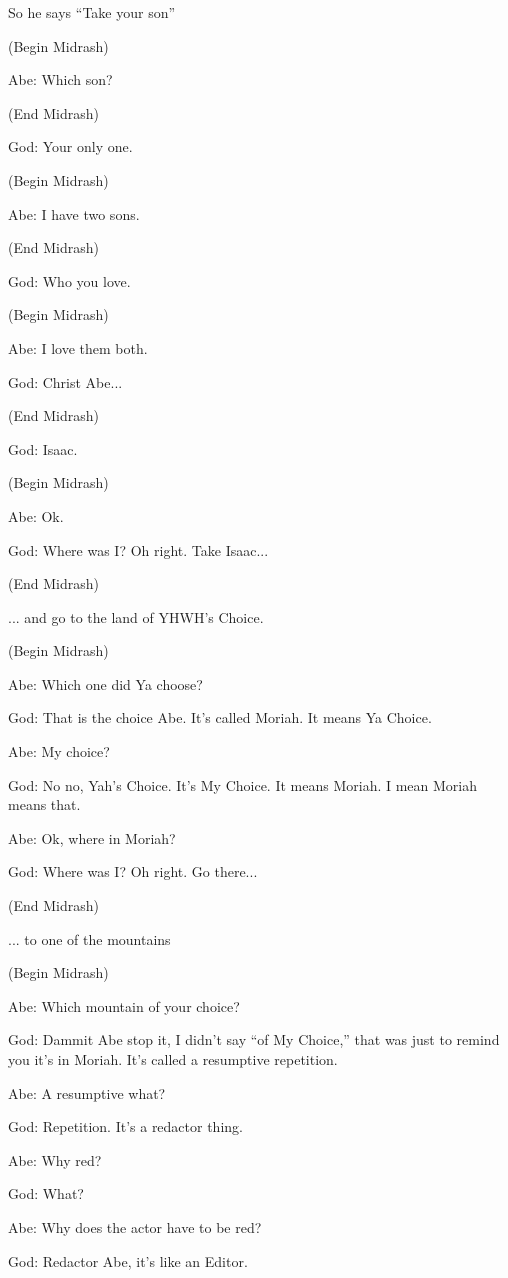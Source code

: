 {
	So he says ``Take your son''

	(Begin Midrash)

	Abe: Which son?

	(End Midrash)

	God: Your only one.

	(Begin Midrash)

	Abe: I have two sons.

	(End Midrash)

	God: Who you love.

	(Begin Midrash)

	Abe: I love them both.

	God: Christ Abe...

	(End Midrash)

	God: Isaac.

	(Begin Midrash)

	Abe: Ok.

	God: Where was I? Oh right. Take Isaac...

	(End Midrash)

	... and go to the land of YHWH's Choice.

	(Begin Midrash)

	Abe: Which one did Ya choose?

	God: That is the choice Abe. It's called Moriah. It means Ya Choice.

	Abe: My choice?

	God: No no, Yah's Choice. It's My Choice. It means Moriah. I mean Moriah means that.

	Abe: Ok, where in Moriah?

	God: Where was I? Oh right. Go there...

	(End Midrash)

	... to one of the mountains 

	(Begin Midrash)

	Abe: Which mountain of your choice?

	God: Dammit Abe stop it, I didn't say ``of My Choice,'' that was just to remind you it's in Moriah. It's called a resumptive repetition.

	Abe: A resumptive what?

	God: Repetition. It's a redactor thing.

	Abe: Why red?

	God: What?

	Abe: Why does the actor have to be red?

	God: Redactor Abe, it's like an Editor.

}
